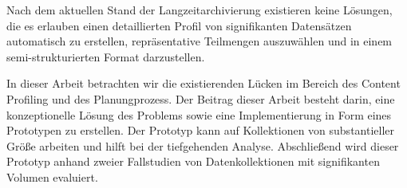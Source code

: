 Nach dem aktuellen Stand der Langzeitarchivierung existieren keine L\"{o}sungen, die es erlauben einen detaillierten Profil von signifikanten Datens\"{a}tzen automatisch zu erstellen, repr\"{a}sentative Teilmengen auszuw\"{a}hlen und in einem semi-strukturierten Format darzustellen.

In dieser Arbeit betrachten wir die existierenden L\"{u}cken im Bereich des Content Profiling und des Planungprozess.
Der Beitrag dieser Arbeit besteht darin, eine konzeptionelle L\"{o}sung des Problems sowie eine Implementierung in Form eines Prototypen zu erstellen.
Der Prototyp kann auf Kollektionen von substantieller Gr\"{o}{\ss}e arbeiten und hilft bei der tiefgehenden Analyse.
Abschlie{\ss}end wird dieser Prototyp anhand zweier Fallstudien von Datenkollektionen mit signifikanten Volumen evaluiert.

